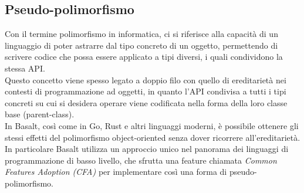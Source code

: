\subsection{Pseudo-polimorfismo}
Con il termine polimorfismo in informatica, ci si riferisce alla capacità di un linguaggio 
di poter astrarre dal tipo concreto di un oggetto, permettendo di scrivere codice che 
possa essere applicato a tipi diversi, i quali condividono la stessa API. \\

Questo concetto viene spesso legato a doppio filo con quello di ereditarietà nei contesti
di programmazione ad oggetti, in quanto l'API condivisa a tutti i tipi concreti su cui 
si desidera operare viene codificata nella forma della loro classe base (parent-class). \\

In Basalt, così come in Go, Rust e altri linguaggi moderni, è possibile ottenere gli stessi 
effetti del polimorfismo object-oriented senza dover ricorrere all'ereditarietà. In particolare
Basalt utilizza un approccio unico nel panorama dei linguaggi di programmazione di basso livello,
che sfrutta una feature chiamata \textit{Common Features Adoption (CFA)} per implementare così una forma di 
pseudo-polimorfismo. \\



